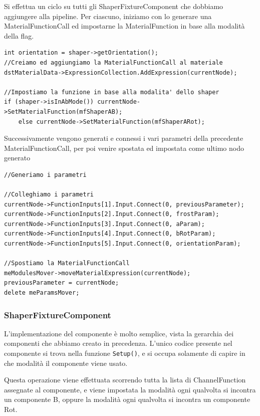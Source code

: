 \documentclass[main.tex]{subfiles}
\begin{document}
Si effettua un ciclo su tutti gli ShaperFixtureComponent che dobbiamo aggiungere alla pipeline. Per ciascuno, iniziamo con lo generare una MaterialFunctionCall ed impostarne la MaterialFunction in base alla modalità della flag.
\clearpage
\begin{lstlisting}
int orientation = shaper->getOrientation();
//Creiamo ed aggiungiamo la MaterialFunctionCall al materiale
dstMaterialData->ExpressionCollection.AddExpression(currentNode);

//Impostiamo la funzione in base alla modalita' dello shaper
if (shaper->isInAbMode()) currentNode->SetMaterialFunction(mfShaperAB);
    else currentNode->SetMaterialFunction(mfShaperARot);
\end{lstlisting}
Successivamente vengono generati e connessi i vari parametri della precedente MaterialFunctionCall, per poi venire spostata ed impostata come ultimo nodo generato
\begin{lstlisting}
//Generiamo i parametri

//Colleghiamo i parametri
currentNode->FunctionInputs[1].Input.Connect(0, previousParameter);
currentNode->FunctionInputs[2].Input.Connect(0, frostParam);
currentNode->FunctionInputs[3].Input.Connect(0, aParam);
currentNode->FunctionInputs[4].Input.Connect(0, bRotParam);
currentNode->FunctionInputs[5].Input.Connect(0, orientationParam);

//Spostiamo la MaterialFunctionCall
meModulesMover->moveMaterialExpression(currentNode);
previousParameter = currentNode;
delete meParamsMover;
\end{lstlisting}

\subsubsection{ShaperFixtureComponent}\label{subsec:5_1_ShaperFixtureComponent}
L'implementazione del componente è molto semplice, vista la gerarchia dei componenti che abbiamo creato in precedenza. L'unico codice  presente nel componente si trova nella funzione \lstinline{Setup()}, e si occupa solamente di capire in che modalità il componente viene usato. 

Questa operazione viene effettuata scorrendo tutta la lista di ChannelFunction assegnate al componente, e viene impostata la modalità  ogni qualvolta si incontra un componente B, oppure la modalità  ogni qualvolta si incontra un componente Rot.
%
\end{document}
